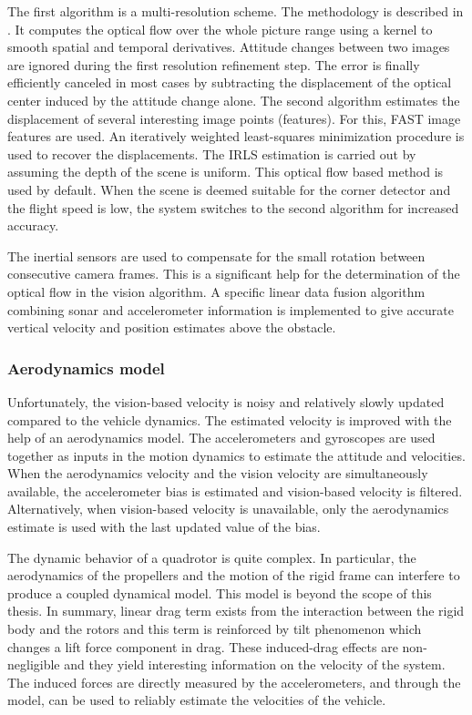 The first algorithm is a multi-resolution scheme.
The methodology is described in \cite{lukas1981iterative}.
It computes the optical flow over the whole picture range using a kernel to smooth spatial and temporal derivatives.
Attitude changes between two images are ignored during the first resolution refinement step.
The error is finally efficiently canceled in most cases by subtracting the displacement of the optical center induced by the attitude change alone.
The second algorithm estimates the displacement of several interesting image points (features).
For this, FAST image features \cite{rosten2010faster} are used.
An iteratively weighted least-squares minimization procedure is used to recover the displacements.
The IRLS estimation \cite{michaelsen2004pose} is carried out by assuming the depth of the scene is uniform.
This optical flow based method is used by default.
When the scene is deemed suitable for the corner detector and the flight speed is low, the system switches to the second algorithm for increased accuracy.

The inertial sensors are used to compensate for the small rotation between consecutive camera frames.
This is a significant help for the determination of the optical flow in the vision algorithm.
A specific linear data fusion algorithm combining sonar and accelerometer information is implemented to give accurate vertical velocity and position estimates above the obstacle.

\subsubsection{Aerodynamics model}
Unfortunately, the vision-based velocity is noisy and relatively slowly updated compared to the vehicle dynamics.
The estimated velocity is improved with the help of an aerodynamics model.
The accelerometers and gyroscopes are used together as inputs in the motion dynamics to estimate the attitude and velocities.
When the aerodynamics velocity and the vision velocity are simultaneously available, the accelerometer bias is estimated and vision-based velocity is filtered.
Alternatively, when vision-based velocity is unavailable, only the aerodynamics estimate is used with the last updated value of the bias.

The dynamic behavior of a quadrotor is quite complex.
In particular, the aerodynamics of the propellers and the motion of the rigid frame can interfere to produce a coupled dynamical model.
This model is beyond the scope of this thesis.
In summary, linear drag term exists from the interaction between the rigid body and the rotors and this term is reinforced by tilt phenomenon which changes a lift force component in drag.
These induced-drag effects are non-negligible and they yield interesting information on the velocity of the system.
The induced forces are directly measured by the accelerometers, and through the model, can be used to reliably estimate the velocities of the vehicle.



